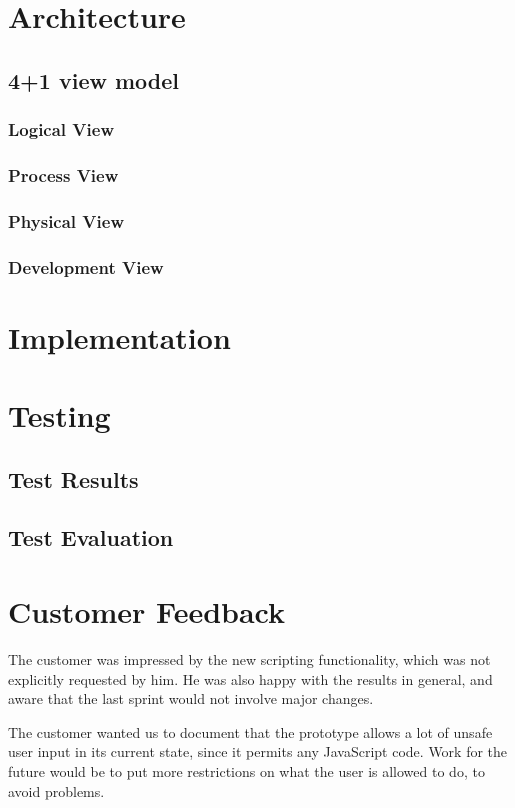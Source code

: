 \section{Architecture}
\subsection{4+1 view model}
\subsubsection{Logical View}
\subsubsection{Process View}
\subsubsection{Physical View}
\subsubsection{Development View}

\section{Implementation}

\section{Testing}
\subsection{Test Results}
\subsection{Test Evaluation}

\section{Customer Feedback}
The customer was impressed by the new scripting functionality, which was not explicitly requested by him. He was also happy with the results in general, and aware that the last sprint would not involve major changes.

The customer wanted us to document that the prototype allows a lot of unsafe user input in its current state, since it permits any JavaScript code. Work for the future would be to put more restrictions on what the user is allowed to do, to avoid problems.

